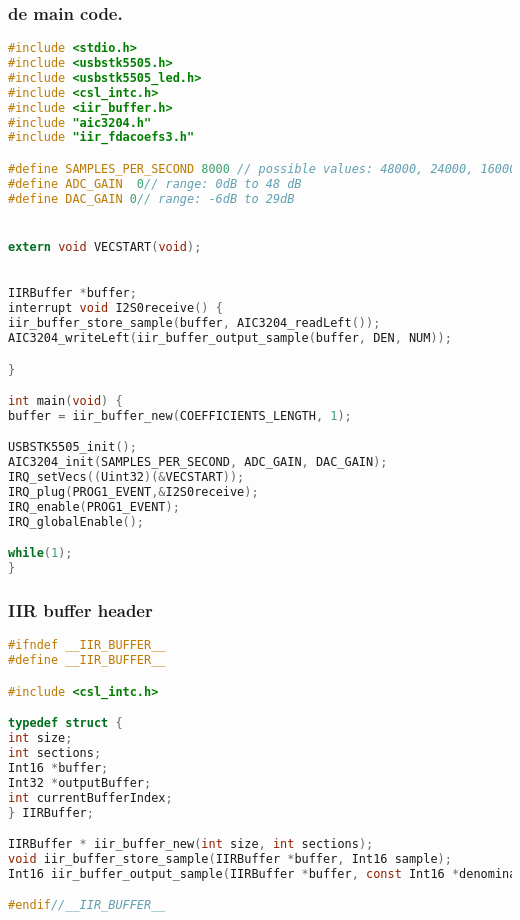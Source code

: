 \subsubsection{de main code.}
\begin{lstlisting}[language=c]
#include <stdio.h>
#include <usbstk5505.h>
#include <usbstk5505_led.h>
#include <csl_intc.h>
#include <iir_buffer.h>
#include "aic3204.h"
#include "iir_fdacoefs3.h"

#define SAMPLES_PER_SECOND 8000 // possible values: 48000, 24000, 16000, 12000, 9600, and 8000
#define ADC_GAIN  0// range: 0dB to 48 dB
#define DAC_GAIN 0// range: -6dB to 29dB


extern void VECSTART(void);

 
IIRBuffer *buffer;
interrupt void I2S0receive() {
iir_buffer_store_sample(buffer, AIC3204_readLeft());
AIC3204_writeLeft(iir_buffer_output_sample(buffer, DEN, NUM));

}

int main(void) {
buffer = iir_buffer_new(COEFFICIENTS_LENGTH, 1);

USBSTK5505_init();
AIC3204_init(SAMPLES_PER_SECOND, ADC_GAIN, DAC_GAIN);
IRQ_setVecs((Uint32)(&VECSTART));
IRQ_plug(PROG1_EVENT,&I2S0receive);
IRQ_enable(PROG1_EVENT);
IRQ_globalEnable();

while(1);
}
\end{lstlisting}
\clearpage

\subsubsection{IIR buffer header}
\begin{lstlisting}[language=c]
#ifndef __IIR_BUFFER__
#define __IIR_BUFFER__

#include <csl_intc.h>

typedef struct {
int size;
int sections;
Int16 *buffer;
Int32 *outputBuffer;
int currentBufferIndex;
} IIRBuffer;

IIRBuffer * iir_buffer_new(int size, int sections);
void iir_buffer_store_sample(IIRBuffer *buffer, Int16 sample);
Int16 iir_buffer_output_sample(IIRBuffer *buffer, const Int16 *denominator, const Int16 *numerator);

#endif//__IIR_BUFFER__
    
\end{lstlisting}
\clearpage

